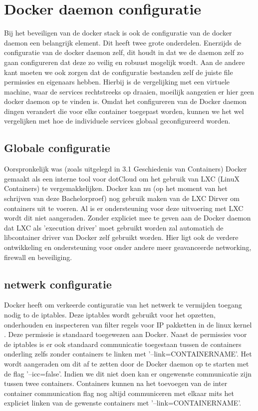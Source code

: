 \section{Docker daemon configuratie}

Bij het beveiligen van de docker stack is ook de configuratie van de docker daemon een belangrijk element. Dit heeft twee grote onderdelen. Enerzijds de configuratie van de docker daemon zelf, dit houdt in dat we de daemon zelf zo gaan configureren dat deze zo veilig en robuust mogelijk wordt. Aan de andere kant moeten we ook zorgen dat de configuratie bestanden zelf de juiste file permissies en eigenaars hebben. Hierbij is de vergelijking met een virtuele machine, waar de services rechtstreeks op draaien, moeilijk aangezien er hier geen docker daemon op te vinden is. Omdat het configureren van de Docker daemon dingen verandert die voor elke container toegepast worden, kunnen we het wel vergelijken met hoe de individuele services globaal geconfigureerd worden.


\subsection{Globale configuratie}


Oorspronkelijk was (zoals uitgelegd in 3.1 Geschiedenis van Containers) Docker gemaakt als een interne tool voor dotCloud om het gebruik van LXC (LinuX Containers) te vergemakkelijken. Docker kan nu (op het moment van het schrijven van deze Bachelorproef) nog gebruik maken van de LXC Dirver om containers uit te voeren. Al is er ondersteuning voor deze uitvoering met LXC wordt dit niet aangeraden. Zonder expliciet mee te geven aan de Docker daemon dat LXC als 'execution driver' moet gebruikt worden zal automatich de libcontainer driver van Docker zelf gebruikt worden. Hier ligt ook de verdere ontwikkeling en ondersteuning voor onder andere meer geavanceerde networking, firewall en beveiliging.

\subsection{netwerk configuratie}

Docker heeft om verkeerde contiguratie van het netwerk te vermijden toegang nodig to de iptables. Deze iptables wordt gebruikt voor het opzetten, onderhouden en inspecteren van filter regels voor IP pakketten in de linux kernel \cite{Eychenne2016}. Deze permissie is standaard toegewezen aan Docker. Naast de permissies voor de iptables is er ook standaard communicatie toegestaan tussen de containers onderling zelfs zonder containers te linken met '--link=CONTAINERNAME'. Het wordt aangeraden om dit af te zetten door de Docker daemon op te starten met de flag '--icc=false'. Indien we dit niet doen kan er ongewenste communicatie zijn tussen twee containers. Containers kunnen na het toevoegen van de inter container communication flag nog altijd communiceren met elkaar mits het expliciet linken van de gewenste containers met '--link=CONTAINERNAME'. 

